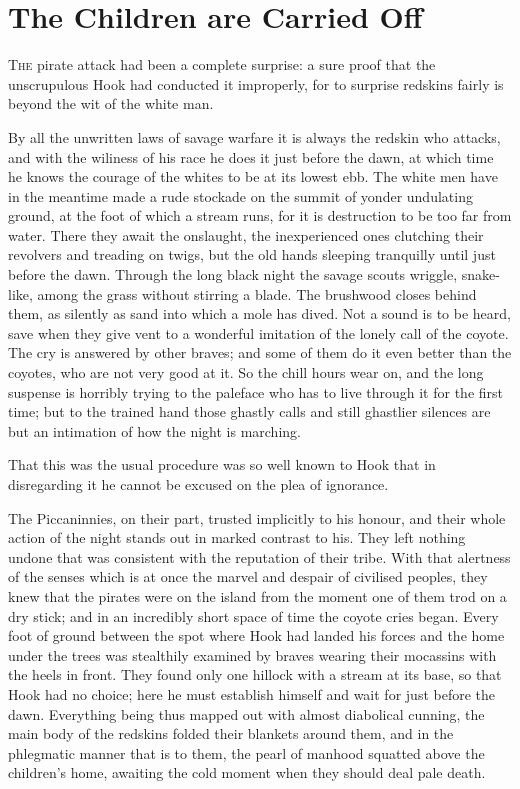 \chapter{The Children are Carried Off}

\lettrine{T}{he} pirate attack had been a complete surprise: a sure proof that the
unscrupulous Hook had conducted it improperly, for to surprise redskins
fairly is beyond the wit of the white man.

By all the unwritten laws of savage warfare it is always the redskin
who attacks, and with the wiliness of his race he does it just before
the dawn, at which time he knows the courage of the whites to be at its
lowest ebb. The white men have in the meantime made a rude stockade on
the summit of yonder undulating ground, at the foot of which a stream
runs, for it is destruction to be too far from water. There they await
the onslaught, the inexperienced ones clutching their revolvers and
treading on twigs, but the old hands sleeping tranquilly until just
before the dawn. Through the long black night the savage scouts
wriggle, snake-like, among the grass without stirring a blade. The
brushwood closes behind them, as silently as sand into which a mole has
dived. Not a sound is to be heard, save when they give vent to a
wonderful imitation of the lonely call of the coyote. The cry is
answered by other braves; and some of them do it even better than the
coyotes, who are not very good at it. So the chill hours wear on, and
the long suspense is horribly trying to the paleface who has to live
through it for the first time; but to the trained hand those ghastly
calls and still ghastlier silences are but an intimation of how the
night is marching.

That this was the usual procedure was so well known to Hook that in
disregarding it he cannot be excused on the plea of ignorance.

The Piccaninnies, on their part, trusted implicitly to his honour, and
their whole action of the night stands out in marked contrast to his.
They left nothing undone that was consistent with the reputation of
their tribe. With that alertness of the senses which is at once the
marvel and despair of civilised peoples, they knew that the pirates
were on the island from the moment one of them trod on a dry stick; and
in an incredibly short space of time the coyote cries began. Every foot
of ground between the spot where Hook had landed his forces and the
home under the trees was stealthily examined by braves wearing their
mocassins with the heels in front. They found only one hillock with a
stream at its base, so that Hook had no choice; here he must establish
himself and wait for just before the dawn. Everything being thus mapped
out with almost diabolical cunning, the main body of the redskins
folded their blankets around them, and in the phlegmatic manner that is
to them, the pearl of manhood squatted above the children's home,
awaiting the cold moment when they should deal pale death.

